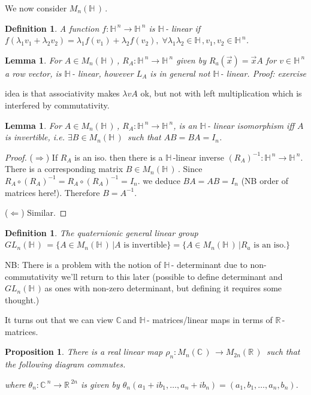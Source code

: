 \documentclass[12pt,a4paper]{article}
\newcommand{\rR}{\ensuremath{\mathbb{R}\,}}
\newcommand{\cC}{\ensuremath{\mathbb{C}\,}}
\newcommand{\hH}{\ensuremath{\mathbb{H}\,}}
\newcommand{\mnc}{\ensuremath{M_n(\cC)\,}}
\newcommand{\mnh}{\ensuremath{M_n(\hH)\,}}
\newcommand{\mr}[1]{\ensuremath{M_{#1}(\rR)\,}}
\newcommand{\glnh}{\ensuremath{GL_n(\hH)\,}}
\newcommand{\ra}{\ensuremath{\Rightarrow}}
\newcommand{\la}{\ensuremath{\Leftarrow}}
\newtheorem{defn}[thm]{Definition}
\newtheorem{lemma}[thm]{Lemma}
\newtheorem{prop}[thm]{Proposition}
\begin{document}
We now consider \mnh.

\begin{defn}
A function $f:\hH ^n \to \hH^n$ is \hH - linear if  $f ( \lambda _1 v_1+\lambda _2 v_2)=\lambda _1 f(v_1)+\lambda _2 f(v_2),\; \forall \lambda _1 \lambda _2 \in \hH , v_1,v_2 \in \hH ^n$.
\end{defn}

\begin{lemma}
For $A \in \mnh$, $R_A:\hH^n\to \hH^n$ given by $R_a(\vec{x})=\vec{x}A$  for $v\in \hH^n$ a row vector, is \hH - linear, however $L_A$ is in general not \hH - linear.
Proof: exercise
\end{lemma}

idea is that associativity makes $\lambda v A$ ok, but not with left multiplication which is interfered by commutativity.

\begin{lemma}
For $A \in \mnh$, $R_A:\hH^n\to \hH^n$, is an \hH - linear isomorphism iff $A$ is invertible, i.e. $\exists B\in \mnh$ such that $AB=BA=I_n$.
\end{lemma}

\begin{proof}
($\ra$) If $R_A$ is an iso. then there is a \hH -linear inverse $(R_A)^{-1}: \hH ^n \to \hH ^n $. There is a corresponding matrix $B\in \mnh$. Since $R_A \circ (R_A)^{-1}=R_A \circ (R_A)^{-1}=I_n$. we deduce $BA=AB=I_n$ (NB order of matrices here!). Therefore $B=A^{-1}$.

($\la$) Similar.
\end{proof}

\begin{defn}
The quaternionic general linear group $\glnh = \{A\in \mnh | A \text{ is invertible}\} = \{A\in \mnh| R_a \text{ is an iso.}\}$
\end{defn}

NB: There is a problem with the notion of \hH - determinant due to non-commutativity we'll return to this later (possible to define determinant and \glnh as ones with non-zero determinant, but defining it requires some thought.)

It turns out that we can view \cC and \hH- matrices/linear maps in terms of \rR- matrices. 

\begin{prop}
There is a real linear map $\rho_n: \mnc \to \mr{2n}$ such that the following diagram commutes. 
\begin{center}
\end{center}
where $\theta _n : \cC ^n \to \rR ^{2n}$ is given by $\theta _n (a_1+ib_1, \ldots , a_n+ib_n )=(a_1,b_1,\ldots, a_n,b_n)$.
\end{prop}
\end{document}
